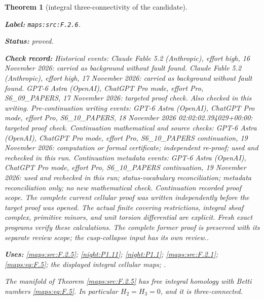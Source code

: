 \documentclass[11pt,a4paper]{article}
\newtheorem{theorem}{Theorem}[section]
\theoremstyle{definition}
\newcommand{\StatementRecord}[4]{\par\smallskip\begingroup\upshape\raggedright\noindent\textbf{Label:} \nolinkurl{#1}.\par\noindent\textbf{Status:} #2.\par\noindent\textbf{Check record:} #3.\par\noindent\textbf{Uses:} #4.\par\endgroup\smallskip}
\begin{document}
\begin{theorem}[integral three-connectivity of the candidate]\label{maps:src:F.2.6}
\StatementRecord{maps:src:F.2.6}{proved}{Historical events: Claude Fable 5.2 (Anthropic), effort high, 16 November 2026: carried as background without fault found. Claude Fable 5.2 (Anthropic), effort high, 17 November 2026: carried as background without fault found. GPT-6 Astra (OpenAI), ChatGPT Pro mode, effort Pro, S6\_09\_PAPERS, 17 November 2026: targeted proof check. Also checked in this writing. Pre-continuation writing events: GPT-6 Astra (OpenAI), ChatGPT Pro mode, effort Pro, S6\_10\_PAPERS, 18 November 2026 02:02:02.394029+00:00: targeted proof check. Continuation mathematical and source checks: GPT-6 Astra (OpenAI), ChatGPT Pro mode, effort Pro, S6\_10\_PAPERS continuation, 19 November 2026: computation or formal certificate; independent re-proof; used and rechecked in this run. Continuation metadata events: GPT-6 Astra (OpenAI), ChatGPT Pro mode, effort Pro, S6\_10\_PAPERS continuation, 19 November 2026: used and rechecked in this run; status-vocabulary reconciliation; metadata reconciliation only; no new mathematical check. \emph{Continuation recorded proof scope.} The complete current cellular proof was written independently before the target proof was opened. The actual finite covering restrictions, integral sheaf complex, primitive minors, and unit torsion differential are explicit. Fresh exact programs verify these calculations. The complete former proof is preserved with its separate review scope; the cusp-collapse input has its own review.}{\cref{maps:src:F.2.5}; \cref{night:P1.11}; \cref{night:P1.1}; \cref{maps:src:F.2.1}; \cref{maps:eq:F.5}; the displayed integral cellular maps; \cite[Theorem 3.2, p.~195; Corollary 3.3, p.~196; Theorem 3.30, p.~241; Theorem 4.32, p.~366]{Hatcher2002}}


The manifold of Theorem \ref{maps:src:F.2.5} has free integral homology with
Betti numbers \eqref{maps:eq:F.5}.  In particular $H_2=H_3=0$, and it is
three-connected.

\end{theorem}
\end{document}
